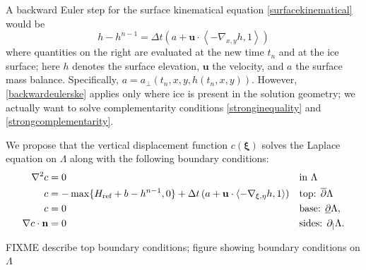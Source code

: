 \documentclass[letterpaper,final,12pt,reqno]{amsart}
\newcommand{\grad}{\nabla}
\newcommand{\bn}{\mathbf{n}}
\newcommand{\bu}{\mathbf{u}}
\newcommand{\bxi}{\bm{\xi}}
\newcommand{\Href}{H_{\text{ref}}}
\begin{document}
A backward Euler step for the surface kinematical equation \eqref{surfacekinematical} would be
\begin{equation}
h - h^{n-1} = \Delta t\left(a + \bu \cdot \left<-\grad_{x,y} h,1\right>\right) \label{backwardeulerske}
\end{equation}
where quantities on the right are evaluated at the new time $t_n$ and at the ice surface; here $h$ denotes the surface elevation, $\bu$ the velocity, and $a$ the surface mass balance.  Specifically, $a=a_{\perp}(t_n,x,y,h(t_n,x,y))$.  However, \eqref{backwardeulerske} applies only where ice is present in the solution geometry; we actually want to solve complementarity conditions \eqref{stronginequality} and \eqref{strongcomplementarity}.

We propose that the vertical displacement function $c(\bxi)$ solves the Laplace equation on $\Lambda$ along with the following boundary conditions:
\begin{align}
        \grad^2 c &= 0 &&\text{in } \Lambda \label{claplace} \\
                c &= -\max\{\Href + b - h^{n-1},0\} + \Delta t\,(a + \bu \cdot \left<-\grad_{\xi,\eta}h,1\right>) &&\text{top: } \overline{\partial} \Lambda \notag \\
                c &= 0 &&\text{base: } \underline{\partial} \Lambda, \notag \\
 \grad c\cdot \bn &= 0 &&\text{sides: } \partial_{|} \Lambda. \notag
\end{align}

FIXME describe top boundary conditions; figure showing boundary conditions on $\Lambda$
\end{document}
